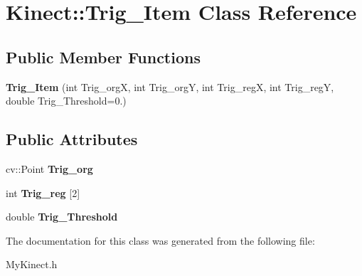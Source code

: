 \hypertarget{class_kinect_1_1_trig___item}{}\section{Kinect\+:\+:Trig\+\_\+\+Item Class Reference}
\label{class_kinect_1_1_trig___item}
\subsection*{Public Member Functions}
\begin{DoxyCompactItemize}
\item 
\mbox{\label{class_kinect_1_1_trig___item_a9c8ecd9b791f28bd584fe56aec27620e}} 
{\bfseries Trig\+\_\+\+Item} (int Trig\+\_\+orgX, int Trig\+\_\+orgY, int Trig\+\_\+regX, int Trig\+\_\+regY, double Trig\+\_\+\+Threshold=0.)
\end{DoxyCompactItemize}
\subsection*{Public Attributes}
\begin{DoxyCompactItemize}
\item 
\mbox{\label{class_kinect_1_1_trig___item_abede8bff44dcecd0d39b73dd0c917f24}} 
cv\+::\+Point {\bfseries Trig\+\_\+org}
\item 
\mbox{\label{class_kinect_1_1_trig___item_a7c5b88544a1ea85c1f8e01eaf3d4e19e}} 
int {\bfseries Trig\+\_\+reg} \mbox{[}2\mbox{]}
\item 
\mbox{\label{class_kinect_1_1_trig___item_a9ef8b9852dc9fd30fdc02214d2b2fa6a}} 
double {\bfseries Trig\+\_\+\+Threshold}
\end{DoxyCompactItemize}


The documentation for this class was generated from the following file\+:\begin{DoxyCompactItemize}
\item 
My\+Kinect.\+h\end{DoxyCompactItemize}
